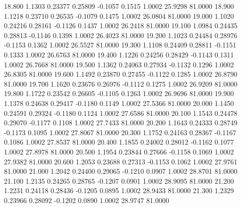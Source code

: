   18.800   1.1303   0.23377   0.25809  -0.1057   0.1515   1.0002  25.9298  81.0000
  18.900   1.1218   0.23710   0.26535  -0.1079   0.1475   1.0002  26.0804  81.0000
  19.000   1.1020   0.24216   0.28161  -0.1126   0.1437   1.0002  26.2418  81.0000
  19.100   1.0984   0.24435   0.28813  -0.1146   0.1398   1.0002  26.4023  81.0000
  19.200   1.1023   0.24484   0.28976  -0.1153   0.1362   1.0002  26.5527  81.0000
  19.300   1.1108   0.24409   0.28811  -0.1151   0.1333   1.0002  26.6763  81.0000
  19.400   1.1226   0.24256   0.28429  -0.1143   0.1311   1.0002  26.7668  81.0000
  19.500   1.1362   0.24063   0.27934  -0.1132   0.1296   1.0002  26.8305  81.0000
  19.600   1.1492   0.23870   0.27455  -0.1122   0.1285   1.0002  26.8790  81.0000
  19.700   1.1620   0.23676   0.26976  -0.1112   0.1275   1.0002  26.9209  81.0000
  19.800   1.1722   0.23542   0.26605  -0.1105   0.1263   1.0002  26.9696  81.0000
  19.900   1.1378   0.24638   0.29417  -0.1180   0.1149   1.0002  27.5366  81.0000
  20.000   1.1450   0.24591   0.29324  -0.1180   0.1124   1.0002  27.6586  81.0000
  20.100   1.1543   0.24478   0.29070  -0.1177   0.1108   1.0002  27.7433  81.0000
  20.200   1.1643   0.24333   0.28749  -0.1173   0.1095   1.0002  27.8067  81.0000
  20.300   1.1752   0.24163   0.28367  -0.1167   0.1086   1.0002  27.8537  81.0000
  20.400   1.1855   0.24002   0.28012  -0.1162   0.1077   1.0002  27.8978  81.0000
  20.500   1.1954   0.23844   0.27666  -0.1158   0.1069   1.0002  27.9382  81.0000
  20.600   1.2053   0.23688   0.27313  -0.1153   0.1062   1.0002  27.9761  81.0000
  21.000   1.2042   0.24400   0.29065  -0.1210   0.0907   1.0002  28.8701  81.0000
  21.100   1.2135   0.24265   0.28765  -0.1207   0.0901   1.0002  28.9095  81.0000
  21.200   1.2231   0.24118   0.28436  -0.1205   0.0895   1.0002  28.9433  81.0000
  21.300   1.2329   0.23966   0.28092  -0.1202   0.0890   1.0002  28.9747  81.0000
